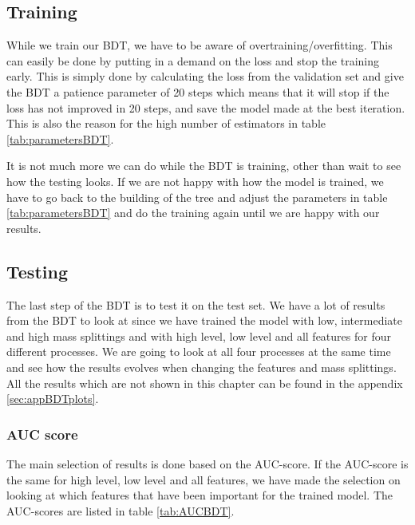 \subsection{Training}
While we train our BDT, we have to be aware of overtraining/overfitting. This can easily be done by putting in a demand on the loss and stop the training early. This is simply done by calculating the loss from the validation set and give the BDT a patience parameter of 20 steps which means that it will stop if the loss has not improved in 20 steps, and save the model made at the best iteration. This is also the reason for the high number of estimators in table \ref{tab:parametersBDT}.

It is not much more we can do while the BDT is training, other than wait to see how the testing looks. If we are not happy with how the model is trained, we have to go back to the building of the tree and adjust the parameters in table \ref{tab:parametersBDT} and do the training again until we are happy with our results.

\subsection{Testing}
The last step of the BDT is to test it on the test set. We have a lot of results from the BDT to look at since we have trained the model with low, intermediate and high mass splittings and with high level, low level and all features for four different processes. We are going to look at all four processes at the same time and see how the results evolves when changing the features and mass splittings. All the results which are not shown in this chapter can be found in the appendix \ref{sec:appBDTplots}. 

\subsubsection{AUC score}
The main selection of results is done based on the AUC-score. If the AUC-score is the same for high level, low level and all features, we have made the selection on looking at which features that have been important for the trained model. The AUC-scores are listed in table \ref{tab:AUCBDT}. 

